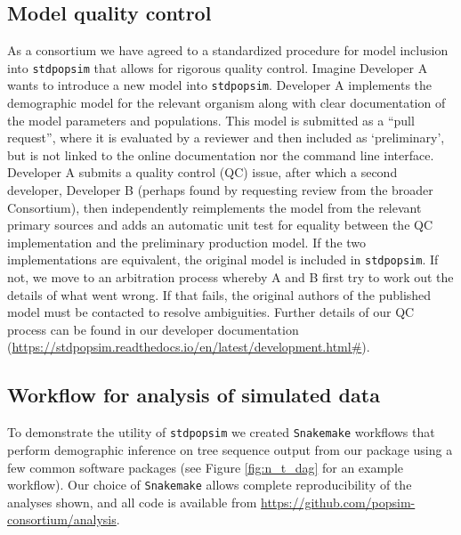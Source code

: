 \documentclass[12pt,halfline,a4paper]{ouparticle}
\newcommand{\stdpopsim}{\texttt{stdpopsim}\xspace}
\begin{document}
\subsection*{Model quality control}
As a consortium we have agreed to a standardized procedure for model inclusion
into \stdpopsim that allows for rigorous quality control. Imagine Developer A
wants to introduce a new model into \stdpopsim. Developer A implements the
demographic model for the relevant organism along with clear documentation
of the model parameters and populations. This model is submitted as a ``pull request'',
where it is evaluated by a reviewer and then included as `preliminary',
but is not linked to the online documentation nor the command line interface.
Developer A submits a quality control (QC) issue, after which a second developer,
Developer B (perhaps found by requesting review from the broader Consortium),
then independently reimplements the model from the relevant
primary sources and adds an automatic unit test for equality between the
QC implementation and the preliminary production model.
If the two implementations are equivalent, the original model is included in \stdpopsim.
If not, we move to an arbitration process whereby A and B first try
to work out the details of what went wrong. If that fails, the original
authors of the published model must be contacted
to resolve ambiguities.
Further details of our QC process can be found in our developer documentation
(\url{https://stdpopsim.readthedocs.io/en/latest/development.html#}).

\subsection*{Workflow for analysis of simulated data}
To demonstrate the utility of \stdpopsim we created \texttt{Snakemake}
workflows \citep{koster2012snakemake} that perform demographic inference on
tree sequence output from our package using a few common software packages (see Figure \ref{fig:n_t_dag} for an example workflow).
Our choice of \texttt{Snakemake} allows complete reproducibility of the
analyses shown, and all code is available from \url{https://github.com/popsim-consortium/analysis}.
\end{document}
